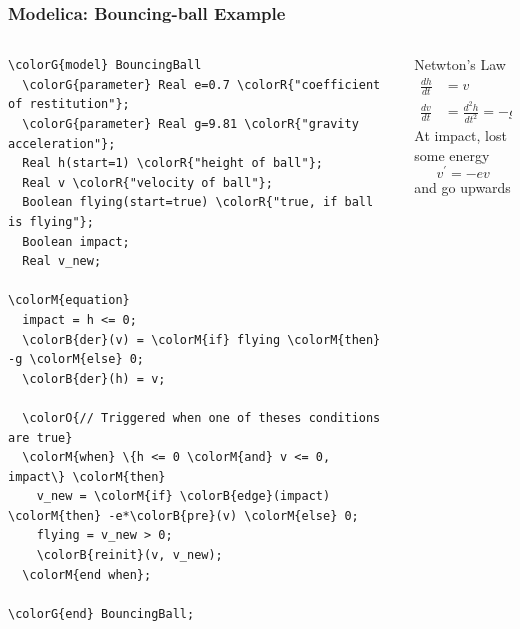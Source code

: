 \begin{frame}[fragile]
  \frametitle{Modelica: Bouncing-ball Example}
  \begin{columns}[T]
    \begin{column}{.6\textwidth}
      \fontsize{8pt}{8pt}\selectfont
\begin{Verbatim}[commandchars=\\\{\}]
\colorG{model} BouncingBall
  \colorG{parameter} Real e=0.7 \colorR{"coefficient of restitution"};
  \colorG{parameter} Real g=9.81 \colorR{"gravity acceleration"};
  Real h(start=1) \colorR{"height of ball"};
  Real v \colorR{"velocity of ball"};
  Boolean flying(start=true) \colorR{"true, if ball is flying"};
  Boolean impact;
  Real v_new;

\colorM{equation}
  impact = h <= 0;
  \colorB{der}(v) = \colorM{if} flying \colorM{then} -g \colorM{else} 0;
  \colorB{der}(h) = v;

  \colorO{// Triggered when one of theses conditions are true}
  \colorM{when} \{h <= 0 \colorM{and} v <= 0, impact\} \colorM{then}
    v_new = \colorM{if} \colorB{edge}(impact) \colorM{then} -e*\colorB{pre}(v) \colorM{else} 0;
    flying = v_new > 0;
    \colorB{reinit}(v, v_new);
  \colorM{end when};

\colorG{end} BouncingBall;
\end{Verbatim}
      \normalsize
    \end{column}
    \begin{column}{.4\textwidth}
      \small
      Netwton's Law
      \begin{align*}
        \frac{dh}{dt} &= v \\
        \frac{dv}{dt} &= \frac{d^2 h}{dt^2} = -g
      \end{align*}
      At impact, lost some energy
      $$ v^\prime = -e v $$
      and go upwards
      \newcommand*{\ClipSep}{1mm}%
      \normalsize
    \end{column}
  \end{columns}
\end{frame}


